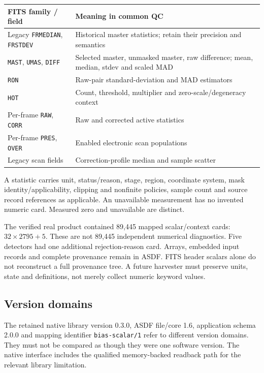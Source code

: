 \documentclass[11pt,a4paper]{article}
\newcommand{\code}[1]{\nolinkurl{#1}}
\begin{document}
\begin{center}\small
\begin{tabular}{p{38mm}p{98mm}}
\toprule FITS family / field & Meaning in common QC \\\midrule
Legacy \code{FRMEDIAN}, \code{FRSTDEV} & Historical master statistics; retain their precision and semantics \\
\code{MAST}, \code{UMAS}, \code{DIFF} & Selected master, unmasked master, raw difference; mean, median, stdev and scaled MAD \\
\code{RON} & Raw-pair standard-deviation and MAD estimators \\
\code{HOT} & Count, threshold, multiplier and zero-scale/degeneracy context \\
Per-frame \code{RAW}, \code{CORR} & Raw and corrected active statistics \\
Per-frame \code{PRES}, \code{OVER} & Enabled electronic scan populations \\
Legacy scan fields & Correction-profile median and sample scatter \\
\bottomrule
\end{tabular}\end{center}
A statistic carries unit, status/reason, stage, region, coordinate system, mask
identity/applicability, clipping and nonfinite policies, sample count and source
record references as applicable. An unavailable measurement has no invented
numeric card. Measured zero and unavailable are distinct.

The verified real product contained 89,445 mapped scalar/context cards:
$32\times2795+5$. These are not 89,445 independent numerical diagnostics.
Five detectors had one additional rejection-reason card. Arrays, embedded
input records and complete provenance remain in ASDF. FITS header scalars alone
do not reconstruct a full provenance tree. A future harvester must preserve
units, state and definitions, not merely collect numeric keyword values.

\subsection*{Version domains}
The retained native library version 0.3.0, ASDF file/core 1.6, application schema
2.0.0 and mapping identifier \code{bias-scalar/1} refer to different version
domains. They must not be compared as though they were
one software version. The native interface includes the qualified memory-backed
readback path for the relevant library limitation.
\end{document}
